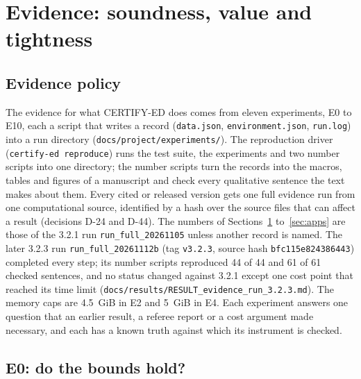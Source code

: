 \documentclass[11pt,a4paper]{article}
\newcommand{\code}[1]{\texttt{#1}}
\begin{document}
\section{Evidence: soundness, value and tightness}
\label{sec:evidence}

\subsection{Evidence policy}

The evidence for what CERTIFY-ED does comes from eleven experiments, E0 to E10, each a script that writes a record
(\code{data.json}, \code{environment.json}, \code{run.log}) into a run directory (\code{docs/project/experiments/}).
The reproduction driver (\code{certify-ed reproduce}) runs the test suite, the experiments and two number scripts into
one directory; the number scripts turn the records into the macros, tables and figures of a manuscript and check every
qualitative sentence the text makes about them. Every cited or released version gets one full evidence run from one
computational source, identified by a hash over the source files that can affect a result (decisions D-24 and D-44).
The numbers of Sections~\ref{sec:evidence} to~\ref{sec:apps} are those of the 3.2.1 run \code{run\_full\_20261105}
unless another record is named. The later 3.2.3 run \code{run\_full\_20261112b} (tag \code{v3.2.3}, source hash
\code{bfc115e824386443}) completed every step; its number scripts reproduced 44 of 44 and 61 of 61 checked sentences,
and no status changed against 3.2.1 except one cost point that reached its time limit
(\code{docs/results/RESULT\_evidence\_run\_3.2.3.md}). The memory caps are 4.5~GiB in E2 and 5~GiB in E4. Each
experiment answers one question that an earlier result, a referee report or a cost argument made necessary, and each
has a known truth against which its instrument is checked.

\subsection{E0: do the bounds hold?}
\end{document}
